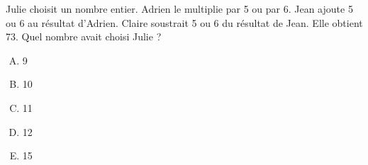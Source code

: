 Julie choisit un nombre entier. Adrien le multiplie par 5 ou par
6. Jean ajoute 5 ou 6 au résultat d'Adrien. Claire soustrait 5 ou 6 du
résultat de Jean. Elle obtient 73. Quel nombre avait choisi Julie ?
\begin{multicols}{5}
  \begin{enumerate}[A)]
  \item 9
  \item 10
  \item 11
  \item 12
  \item 15
  \end{enumerate}
\end{multicols}